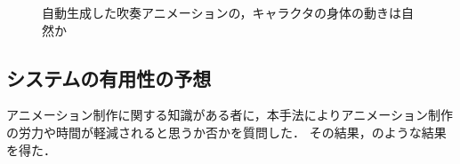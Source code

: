\begin{figure}[t]
	\centering
	\caption{自動生成した吹奏アニメーションの，キャラクタの身体の動きは自然か}
	\label{fig:Q2-tb}
\end{figure}

\subsection{システムの有用性の予想}
アニメーション制作に関する知識がある者に，本手法によりアニメーション制作の労力や時間が軽減されると思うか否かを質問した．
その結果，のような結果を得た．